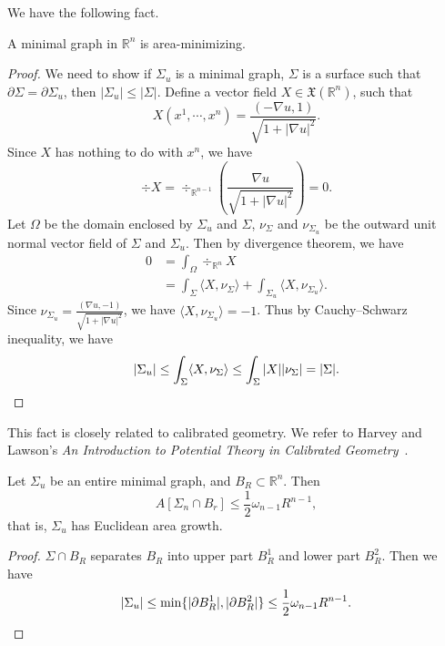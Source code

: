 We have the following fact.
\begin{prop}
    A minimal graph in $\mathbb{R}^n$ is area-minimizing.
\end{prop}
\begin{proof}
    We need to show if $\Sigma_u$ is a minimal graph, $\Sigma$ is a surface such that $\partial\Sigma=\partial\Sigma_u$, then $|\Sigma_u|\leq|\Sigma|$.
    Define a vector field $X\in\mathfrak{X}(\mathbb{R}^n)$, such that
    \[X(x^1,\cdots,x^n)=\frac{(-\nabla u,1)}{\sqrt{1+|\nabla u|^2}}.\]
    Since $X$ has nothing to do with $x^n$, we have
    \[\div{X}=\div\nolimits_{\mathbb{R}^{n-1}}\left(\frac{\nabla u}{\sqrt{1+|\nabla u|^2}}\right)=0.\]
    Let $\Omega$ be the domain enclosed by $\Sigma_u$ and $\Sigma$, $\nu_\Sigma$ and $\nu_{\Sigma_u}$ be the outward unit normal vector field of $\Sigma$ and $\Sigma_u$.
    Then by divergence theorem, we have
    \begin{align*}
        0&=\int_\Omega\div\nolimits_{\mathbb{R}^n}X\\
        &=\int_\Sigma\langle X,\nu_\Sigma\rangle+\int_{\Sigma_u}\langle X,\nu_{\Sigma_u}\rangle.
    \end{align*}
    Since $\nu_{\Sigma_u}=\frac{(\nabla u,-1)}{\sqrt{1+|\nabla u|^2}}$, we have $\langle X,\nu_{\Sigma_u}\rangle=-1$.
    Thus by Cauchy--Schwarz inequality, we have
    \[|\Sigma_u|\leq\int_\Sigma\langle X,\nu_\Sigma\rangle\leq\int_\Sigma|X||\nu_\Sigma|=|\Sigma|.\qedhere\]
\end{proof}

\begin{rem}
    This fact is closely related to calibrated geometry.
    We refer to Harvey and Lawson's \emph{An Introduction to Potential Theory in Calibrated Geometry}~\cite{Harvey-Lawson}.
\end{rem}

\begin{cor}
    Let $\Sigma_u$ be an entire minimal graph, and $B_R\subset\mathbb{R}^n$.
    Then
    \[A[\Sigma_n\cap B_r]\leq\frac{1}{2}\omega_{n-1}R^{n-1},\]
    that is, $\Sigma_u$ has Euclidean area growth.
\end{cor}
\begin{proof}
    $\Sigma\cap B_R$ separates $B_R$ into upper part $B^1_R$ and lower part $B^2_R$.
    Then we have
    \[|\Sigma_u|\leq\min\{|\partial B^1_R|,|\partial B^2_R|\}\leq\frac{1}{2}\omega_{n-1}R^{n-1}.\qedhere\]
\end{proof}

